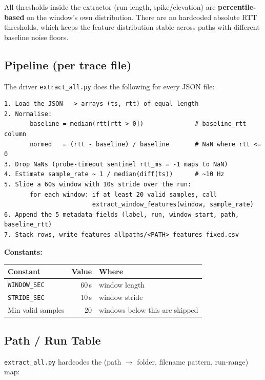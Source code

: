 \documentclass[11pt,a4paper]{article}
\begin{document}
All thresholds inside the extractor (run-length, spike/elevation) are
\textbf{percentile-based} on the window's own distribution. There are no
hardcoded absolute RTT thresholds, which keeps the feature distribution
stable across paths with different baseline noise floors.

\subsection{Pipeline (per trace file)}

The driver \texttt{extract\_all.py} does the following for every JSON file:

\begin{lstlisting}
1. Load the JSON  -> arrays (ts, rtt) of equal length
2. Normalise:
       baseline = median(rtt[rtt > 0])              # baseline_rtt column
       normed   = (rtt - baseline) / baseline       # NaN where rtt <= 0
3. Drop NaNs (probe-timeout sentinel rtt_ms = -1 maps to NaN)
4. Estimate sample_rate ~ 1 / median(diff(ts))      # ~10 Hz
5. Slide a 60s window with 10s stride over the run:
       for each window: if at least 20 valid samples, call
                        extract_window_features(window, sample_rate)
6. Append the 5 metadata fields (label, run, window_start, path, baseline_rtt)
7. Stack rows, write features_allpaths/<PATH>_features_fixed.csv
\end{lstlisting}

\textbf{Constants:}

\begin{tabular}{@{}lrl@{}}
\toprule
\textbf{Constant}   & \textbf{Value} & \textbf{Where} \\
\midrule
\texttt{WINDOW\_SEC}     & 60\,s & window length \\
\texttt{STRIDE\_SEC}     & 10\,s & window stride \\
Min valid samples        & 20    & windows below this are skipped \\
\bottomrule
\end{tabular}

\subsection{Path / Run Table}

\texttt{extract\_all.py} hardcodes the (path $\rightarrow$ folder, filename
pattern, run-range) map:
\end{document}
